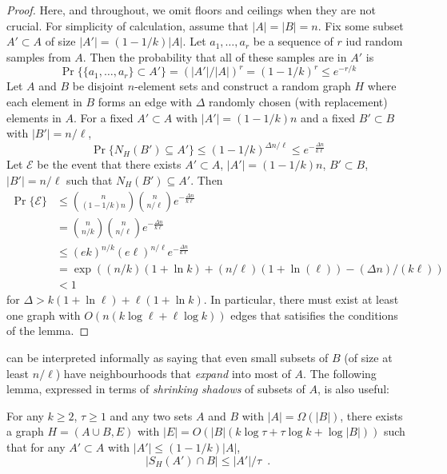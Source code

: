 \documentclass{patmorin}
\begin{document}
\begin{proof}
  Here, and throughout, we omit floors and ceilings when they are not crucial.
  For simplicity of calculation, assume that $|A|=|B|=n$.  Fix some
  subset $A'\subset A$ of size $|A'|=(1-1/k)|A|$.  Let $a_1,\ldots,a_r$
  be a sequence of $r$ iud random samples from $A$.  Then the probability
  that all of these samples are in $A'$ is
  \[
     \Pr\{\{a_1,\ldots,a_r\}\subset A'\} = (|A'|/|A|)^r = (1-1/k)^r \le e^{-r/k}
  \]
  Let $A$ and $B$ be disjoint $n$-element sets and construct a random
  graph $H$ where each element in $B$ forms an edge with $\Delta$ randomly
  chosen (with replacement) elements in $A$.  For a fixed $A'\subset A$
  with $|A'|=(1-1/k)n$ and a fixed $B'\subset B$ with $|B'| = n/\ell$,
  \[
    \Pr\{N_H(B') \subseteq A'\} 
        \le (1-1/k)^{\Delta n/\ell} 
        \le e^{-\frac{\Delta n}{k\ell}}
  \]
  Let $\mathcal{E}$ be the event that there exists $A'\subset
  A$, $|A'|=(1-1/k)n$, $B'\subset B$, $|B'|=n/\ell$ such that
  $N_H(B')\subseteq A'$.  Then
  \begin{align*}
    \Pr\{\mathcal{E}\} 
        & \le \binom{n}{(1-1/k)n}\binom{n}{n/\ell}e^{-\frac{\Delta n}{k\ell}} \\
        & = \binom{n}{n/k}\binom{n}{n/\ell}e^{-\frac{\Delta n}{k\ell}} \\
        & \le (ek)^{n/k} (e\ell)^{n/\ell}e^{-\frac{\Delta n}{k\ell}} \\
        & = \exp((n/k)(1+\ln k) + (n/\ell)(1+\ln(\ell)) - (\Delta n)/(k\ell)) \\
        & < 1
  \end{align*}
  for $\Delta > k(1+\ln \ell) + \ell(1+\ln k)$.  In particular, there
  must exist at least one graph with $O(n(k\log\ell + \ell\log k))$
  edges that satisifies the conditions of the lemma.
\end{proof}

 can be interpreted informally as saying that even small
subsets of $B$ (of size at least $n/\ell$) have neighbourhoods that
\emph{expand} into most of $A$.  The following lemma, expressed in terms of
\emph{shrinking shadows} of subsets of $A$, is also useful:

\begin{lem}
   For any $k\ge 2$, $\tau\ge 1$ and any two sets $A$ and $B$ with
   $|A|=\Omega(|B|)$, there exists a graph $H=(A\cup B,E)$ with $|E|=O(|B|(k\log
   \tau + \tau\log k + \log|B|))$ such that for any $A'\subset A$ with $|A'|\le
   (1-1/k)|A|$,
   \[ |S_H(A')\cap B| \le |A'|/\tau \enspace .\]
\end{lem}
\end{document}
